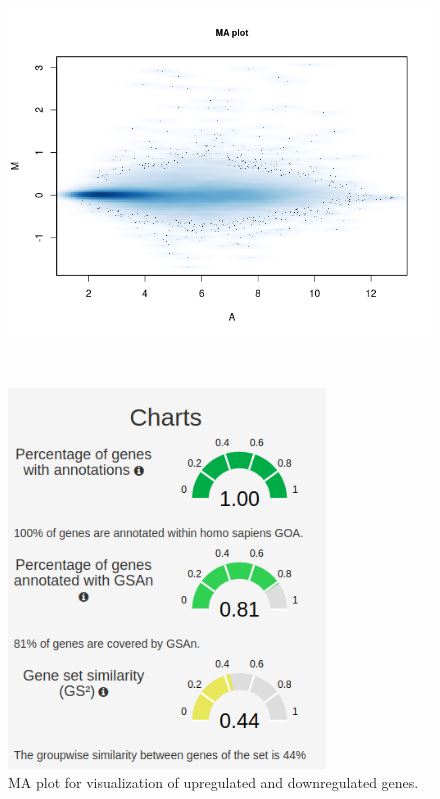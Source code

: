 \documentclass[journal, a4paper]{IEEEtran}
\begin{document}
\begin{figure}[!htp]
  \begin{center}
    \begin{minipage}{0.5 \textwidth}
      \centering
      \includegraphics[width=\textwidth]{../analysis/MA-plot-AD-paired-design.png}
      \caption{MA plot for visualization of upregulated and downregulated genes.}
      \label{fig:MA}
    \end{minipage}\\
    \begin{minipage}{0.5 \textwidth}
      \centering
      \includegraphics[width=0.75\textwidth]{gsan-charts.png}

\end{minipage}
\end{center}
\end{figure}
\end{document}
